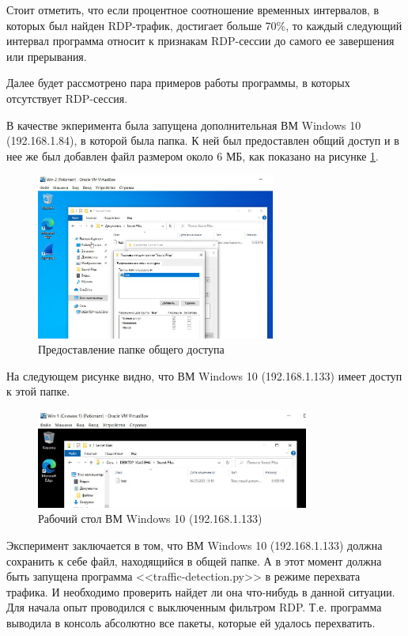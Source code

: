 \documentclass[bachelor, och, coursework]{SCWorks}
\begin{document}
Стоит отметить, что если процентное соотношение временных интервалов, в которых был найден RDP-трафик, достигает больше 70\%, 
то каждый следующий интервал программа
относит к признакам RDP-сессии до самого ее завершения или прерывания.

Далее будет рассмотрено пара примеров работы программы, в которых отсутствует RDP-сессия.

В качестве экперимента была запущена дополнительная ВМ Windows 10 (192.168.1.84), в которой была папка. К ней был предоставлен
общий доступ и в нее же был добавлен файл размером около 6 МБ, как показано
на рисунке \ref{smb-win1}.

\begin{figure}[H]
  \centering
  \includegraphics[width=0.7\textwidth]{photo/smb-win1.jpg}
  \caption{Предоставление папке общего доступа}
  \label{smb-win1}
\end{figure}

На следующем рисунке видно, что ВМ Windows 10 (192.168.1.133) имеет доступ к этой папке.

\begin{figure}[H]
  \centering
  \includegraphics[width=0.8\textwidth]{photo/smb-win2.jpg}
  \caption{Рабочий стол ВМ Windows 10 (192.168.1.133)}
  \label{smb-win2}
\end{figure}

Эксперимент заключается в том, что ВМ Windows 10 (192.168.1.133) должна сохранить к себе файл, находящийся в общей папке.
А в этот момент должна быть запущена программа <<traffic-detection.py>> в режиме перехвата трафика. И необходимо проверить
найдет ли она что-нибудь в данной ситуации. Для начала опыт проводился с выключенным фильтром RDP. Т.е. программа выводила в
консоль абсолютно все пакеты, которые ей удалось перехватить.
\end{document}
